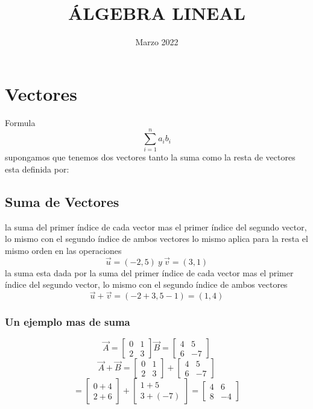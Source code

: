 \documentclass{article}
\title{\textbf{ÁLGEBRA LINEAL}}
\date{Marzo 2022}
\begin{document}
\maketitle



\section{Vectores}
Formula
\[
    \displaystyle\sum\limits_{i=1}^n a_{i}b_{i}
\]
supongamos que tenemos dos vectores
tanto la suma como la resta de vectores esta definida por: \\


\subsection{Suma de Vectores}
la suma del primer índice de cada vector mas el primer índice del segundo vector,
lo mismo con el segundo índice de ambos vectores
lo mismo aplica para la resta el mismo orden en las operaciones
\[
    \vec{u} = ( -2,5) \: y \:
    \vec{v} =  (3,1)
\]
la suma esta dada por
la suma del primer índice de cada vector mas el primer índice del segundo vector,
lo mismo con el segundo índice de ambos vectores
\[
\vec{u} +\vec{v} = (-2 + 3, 5 - 1) = (1,4)
\]
\subsubsection{Un ejemplo mas de suma}
\[
\vec{A} = \begin{bmatrix}0 & 1 \\2 & 3 \end{bmatrix} \vec{B} = \begin{bmatrix}4 & 5 \\6 & -7 \end{bmatrix}
\]
\[
\vec{A} +\vec{B} =\begin{bmatrix}0 & 1 \\2 & 3 \end{bmatrix} + \begin{bmatrix}4 & 5 \\6 & -7 \end{bmatrix}
\]
\[
    =\begin{bmatrix}0+4 \\2+6 \end{bmatrix} + \begin{bmatrix}1+5 \\3+(-7) \end{bmatrix} = \begin{bmatrix}4 &  6 \\8 & -4 \end{bmatrix}
\]
\end{document}
